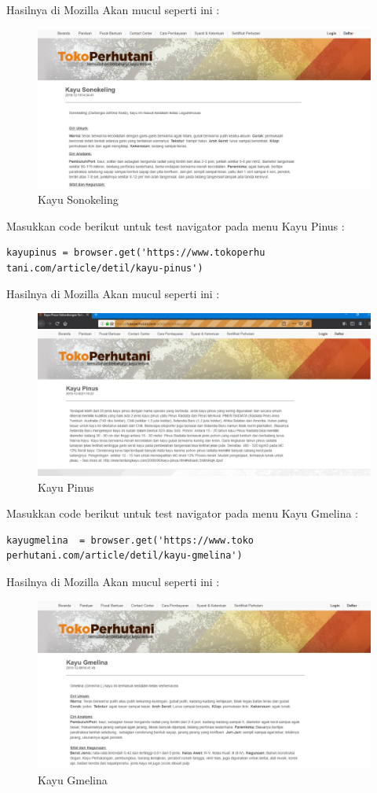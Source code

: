 Hasilnya  di Mozilla Akan mucul seperti ini :
\begin{figure}[h]
	\centering
	\includegraphics[scale=0.332]{figures/cc}
	\caption{Kayu Sonokeling}
\end{figure}

Masukkan code berikut untuk test navigator pada menu Kayu Pinus :
\begin{verbatim}
kayupinus = browser.get('https://www.tokoperhu
tani.com/article/detil/kayu-pinus')
\end{verbatim}

Hasilnya  di Mozilla Akan mucul seperti ini :
\begin{figure}[h]
	\centering
	\includegraphics[scale=0.25]{figures/j1}
	\caption{Kayu Pinus}
\end{figure}

Masukkan code berikut untuk test navigator pada menu Kayu Gmelina :
\begin{verbatim}
kayugmelina  = browser.get('https://www.toko
perhutani.com/article/detil/kayu-gmelina')
\end{verbatim}

Hasilnya  di Mozilla Akan mucul seperti ini :
\begin{figure}[h]
	\centering
	\includegraphics[scale=0.255]{figures/j2}
	\caption{Kayu Gmelina}
\end{figure}

